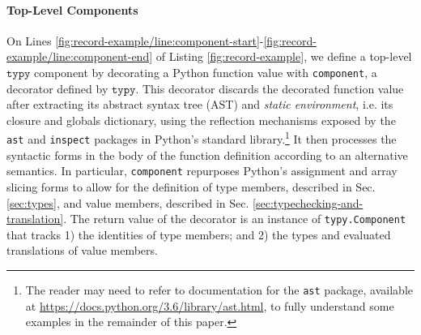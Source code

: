 \documentclass[preprint,10pt]{sigplanconf}
\newcommand{\typy}{\texttt{typy}}
\newcommand{\lip}[1]{\lstinline[language=Python,basicstyle=\ttfamily\footnotesize,deletendkeywords={tuple,buffer,map}]{#1}}
\begin{document}
\paragraph{Top-Level Components}
On Lines \ref{fig:record-example/line:component-start}-\ref{fig:record-example/line:component-end} of Listing \ref{fig:record-example}, we define a top-level $\typy$ component by decorating a Python function value with \lip{component}, a decorator defined by $\typy$. 
This decorator discards the decorated function value  after extracting its abstract syntax tree (AST) and \emph{static environment}, i.e. its closure and globals dictionary, using the reflection mechanisms exposed by the \lip{ast} and \lip{inspect}  packages in Python's standard library.\footnote{The reader may need to refer to  documentation for the \lip{ast} package, available at \url{https://docs.python.org/3.6/library/ast.html}, to fully understand some examples in the remainder of this paper.} It then processes the syntactic forms in the body of the function definition according to an alternative semantics. In particular, \lip{component} repurposes Python's assignment and array slicing forms to allow for the definition of type members, described in Sec. \ref{sec:types}, and value members, described in Sec. \ref{sec:typechecking-and-translation}. The return value of the decorator is an instance of \lip{typy.Component} that tracks 1) the identities of type members; and 2) the types and evaluated translations of value members.%

%


\end{document}

